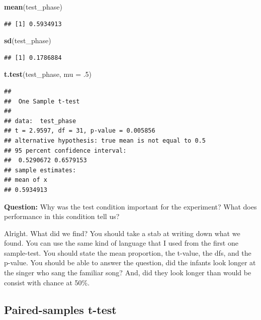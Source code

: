 \documentclass[]{book}
\newenvironment{Shaded}{\begin{snugshade}}{\end{snugshade}}
\newcommand{\KeywordTok}[1]{\textcolor[rgb]{0.13,0.29,0.53}{\textbf{#1}}}
\newcommand{\DataTypeTok}[1]{\textcolor[rgb]{0.13,0.29,0.53}{#1}}
\newcommand{\DecValTok}[1]{\textcolor[rgb]{0.00,0.00,0.81}{#1}}
\newcommand{\NormalTok}[1]{#1}
\begin{document}
\begin{Shaded}
\begin{Highlighting}[]
\KeywordTok{mean}\NormalTok{(test_phase)}
\end{Highlighting}
\end{Shaded}

\begin{verbatim}
## [1] 0.5934913
\end{verbatim}

\begin{Shaded}
\begin{Highlighting}[]
\KeywordTok{sd}\NormalTok{(test_phase)}
\end{Highlighting}
\end{Shaded}

\begin{verbatim}
## [1] 0.1786884
\end{verbatim}

\begin{Shaded}
\begin{Highlighting}[]
\KeywordTok{t.test}\NormalTok{(test_phase, }\DataTypeTok{mu =}\NormalTok{ .}\DecValTok{5}\NormalTok{)}
\end{Highlighting}
\end{Shaded}

\begin{verbatim}
## 
##  One Sample t-test
## 
## data:  test_phase
## t = 2.9597, df = 31, p-value = 0.005856
## alternative hypothesis: true mean is not equal to 0.5
## 95 percent confidence interval:
##  0.5290672 0.6579153
## sample estimates:
## mean of x 
## 0.5934913
\end{verbatim}

\textbf{Question:} Why was the test condition important for the
experiment? What does performance in this condition tell us?

Alright. What did we find? You should take a stab at writing down what
we found. You can use the same kind of language that I used from the
first one sample-test. You should state the mean proportion, the
t-value, the dfs, and the p-value. You should be able to answer the
question, did the infants look longer at the singer who sang the
familiar song? And, did they look longer than would be consist with
chance at 50\%.

\subsection{Paired-samples t-test}\label{paired-samples-t-test}
\end{document}
